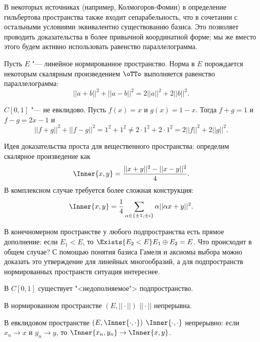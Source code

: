 \documentclass[main]{subfiles}
\begin{document}
\begin{remark}
  В некоторых источниках (например, Колмогоров-Фомин)
  в определение гильбертова пространства также входит
  сепарабельность, что в сочетании с остальными
  условиями эквивалентно существованию базиса.
  Это позволяет проводить доказательства в более
  привычной координатной форме;
  мы же вместо этого будем активно использовать
  равенство параллелограмма.
\end{remark}

\begin{theorem}[б/д]
  Пусть \( E \) "--- линейное нормированное пространство.
  Норма в \( E \) порождается некоторым
  скалярным произведением \( \oTTo \) выполняется
  равенство
  параллелограмма:
  \[ ||a + b||^2 + ||a - b||^2 = 2||a||^2 + 2||b||^2. \]
\end{theorem}

\begin{example}
  \( C[0, 1] \) "--- не евклидово.
  Пусть \( f(x) = x \) и \( g(x) = 1 - x \).
  Тогда \( f + g = 1 \) и \( f - g = 2x - 1 \) и
  \[ ||f + g||^2 + ||f - g||^2 = 1^2 + 1^2 \ne 2 \cdot 1^2 + 2 \cdot 1^2 =
  2 ||f||^2 + 2||g||^2. \]
\end{example}

Идея доказательства проста для вещественного пространства:
определим скалярное произведение как
\[ \Inner{x, y} = \frac{||x + y||^2 - ||x - y||^2}{4}. \]
В комплексном случае требуется более сложная конструкция:
\[ \Inner{x, y} = \frac{1}{4} \sum_{\alpha \in \{ \pm 1, \pm i \}}
\alpha ||\alpha x + y||^2. \]

В конечномерном пространстве
у любого подпространства есть прямое дополнение:
если \( E_1 < E \), то \( \Exists{E_2 < E} E_1 \oplus E_2 = E \).
Что происходит в общем случае?
С помощью понятия базиса Гамеля и аксиомы выбора
можно доказать это утверждение для линейных многообразий,
а для подпространств нормированных пространств ситуация интереснее.

\begin{problem}
  В \( C[0, 1] \) существует "<недополняемое"> подпространство.
\end{problem}

\begin{exercise}
  В нормированном пространстве \( (E, ||\cdot||) \)
  \( || \cdot || \) непрерывна.
\end{exercise}

\begin{exercise}
  В евклидовом пространстве \( (E, \Inner{\cdot, \cdot}) \)
  \( \Inner{\cdot, \cdot} \) непрерывно:
  если \( x_n \to x \) и \( y_n \to y \),
  то \( \Inner{x_n, y_n} \to \Inner{x, y} \).
\end{exercise}
\end{document}
